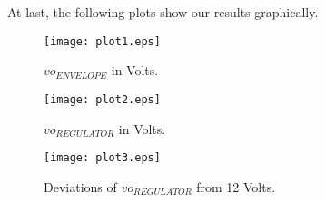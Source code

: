 \noindent At last, the following plots show our results graphically.

\begin{figure}[h!] \centering
\texttt{[image: plot1.eps]}
\caption{$vo_{ENVELOPE}$ in Volts.}
\label{fig:values1}
\end{figure}

\begin{figure}[h!] \centering
\texttt{[image: plot2.eps]}
\caption{$vo_{REGULATOR}$ in Volts.}
\label{fig:values2}
\end{figure}

\begin{figure}[h!] \centering
\texttt{[image: plot3.eps]}
\caption{Deviations of $vo_{REGULATOR}$ from 12 Volts.}
\label{fig:deviations}
\end{figure}

